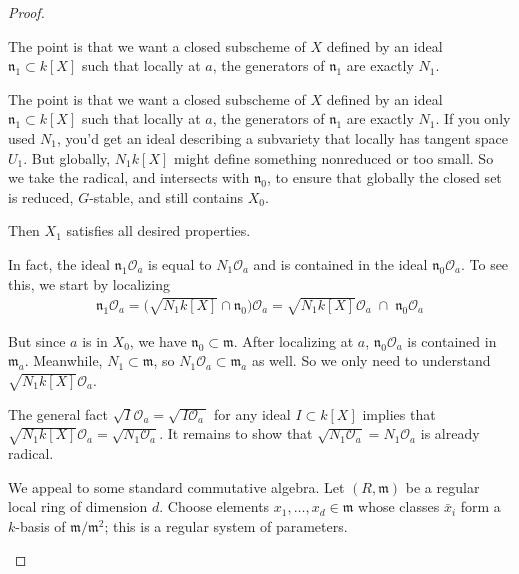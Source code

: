\documentclass[12pt]{article}
\begin{document}
\begin{proof}
\begin{remark}
    The point is that we want a closed subscheme of $X$ defined by an ideal $\mathfrak{n}_1 \subset k[X]$ such that locally at $a$, the generators of $\mathfrak{n}_1$ are exactly $N_1$.

                The point is that we want a closed subscheme of $X$ defined by an ideal $\mathfrak{n}_1 \subset k[X]$ such that locally at $a$, the generators of $\mathfrak{n}_1$ are exactly $N_1$. If you only used $N_1$, you’d get an ideal describing a subvariety that locally has tangent space $U_1$. But globally, $N_1 k[X]$ might define something nonreduced or too small. So we take the radical, and intersects with $\mathfrak{n}_0$, to ensure that globally the closed set is reduced, $G$-stable, and still contains $X_0$.
            \end{remark}




Then $X_1$ satisfies all desired properties.  

In fact, the ideal $\mathfrak{n}_1 \mathcal{O}_a$ is equal to $N_1 \mathcal{O}_a$ and is contained in the ideal $\mathfrak{n}_0 \mathcal{O}_a$. To see this, we start by localizing \begin{align*}
    \mathfrak n_1 \mathcal O_a
= \big(\sqrt{N_1 k[X]} \cap \mathfrak n_0\big)\mathcal O_a
= \sqrt{N_1 k[X]}\mathcal O_a \;\cap\; \mathfrak n_0 \mathcal O_a
\end{align*}

But since $a$ is in $X_0$, we have $\mathfrak{n}_0 \subset \mathfrak{m}$. After localizing at $a$, $\mathfrak{n}_0\mathcal{O}_a$ is contained in $\mathfrak{m}_a$. Meanwhile, $N_1\subset \mathfrak{m}$, so $N_1\mathcal{O}_a \subset \mathfrak{m}_a$ as well. So we only need to understand $\sqrt{N_1 k[X]}\mathcal{O}_a$.

The general fact $\sqrt{I}\mathcal{O}_a = \sqrt{\,I\mathcal{O}_a\,}$ for any ideal $I \subset k[X]$ implies that $\sqrt{N_1k[X]} \mathcal{O}_a = \sqrt{N_1 \mathcal{O}_a}$. It remains to show that $\sqrt{N_1\mathcal{O}_a} = N_1\mathcal{O}_a$ is already radical.

\begin{remark}
    We appeal to some standard commutative algebra. Let $(R,\mathfrak{m})$ be a regular local ring of dimension $d$.
    Choose elements $x_1,\dots,x_d\in\mathfrak{m}$ whose classes $\bar{x}_i$ form a $k$-basis of $\mathfrak{m}/\mathfrak{m}^2$; this is a regular system of parameters.


\end{remark}
\end{proof}
\end{document}
